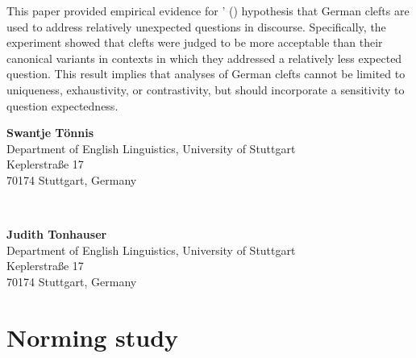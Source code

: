 \documentclass{salt}
\begin{document}
This paper provided empirical evidence for  \citeauthor{tonnis_2021}' (\citeyear{tonnis_2021}) hypothesis that German clefts are used to address relatively unexpected questions in discourse. Specifically, the experiment showed that clefts were judged to be more acceptable than their canonical variants in contexts in which they addressed a relatively less expected question. This result implies that analyses of German clefts cannot be limited to uniqueness, exhaustivity, or contrastivity, but should incorporate a sensitivity to question expectedness. 






\newpage

\begin{addresses}
  \begin{address}
    \textbf{Swantje T\"onnis} \\
    Department of English Linguistics, University of Stuttgart\\
	Keplerstraße 17\\
	70174 Stuttgart, Germany\\
  \end{address}\\
  \begin{address}
    \textbf{Judith Tonhauser }\\
    Department of English Linguistics, University of Stuttgart\\
    Keplerstraße 17\\
	70174 Stuttgart, Germany\\
  \end{address}
\end{addresses}


\appendix

\setcounter{table}{0}
\renewcommand{\thetable}{A\arabic{table}}

\setcounter{figure}{0}
\renewcommand{\thefigure}{A\arabic{figure}}

\newpage

\section{Norming study}\label{sec:appendix_b}
\end{document}
